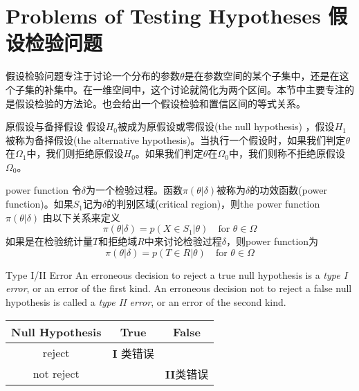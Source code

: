 \documentclass[../main.tex]{subfiles}
\begin{document}
\section{Problems of Testing Hypotheses 假设检验问题}
假设检验问题专注于讨论一个分布的参数$\theta$是在参数空间的某个子集中，还是在这个子集的补集中。在一维空间中，这个讨论就简化为两个区间。本节中主要专注的是假设检验的方法论。也会给出一个假设检验和置信区间的等式关系。

\begin{definition}{原假设与备择假设}{}
假设$H_0$被成为原假设或零假设(the null hypothesis) ，假设$H_1$被称为备择假设(the alternative hypothesis)。当执行一个假设时，如果我们判定$\theta$在$\Omega_1$中，我们则拒绝原假设$H_0$。如果我们判定$\theta$在$\Omega_0$中，我们则称不拒绝原假设$\Omega_0$。
\end{definition}


\begin{definition}{power function}{}
令$\delta$为一个检验过程。函数$\pi(\theta|\delta)$被称为$\delta$的功效函数(power function)。如果$S_1$记为$\delta$的判别区域(critical region)，则the power function $\pi(\theta|\delta)$ 由以下关系来定义
\begin{equation}\label{}
\pi(\theta|\delta)=p(X\in S_1| \theta) \quad\text{for $\theta \in \Omega$}
\end{equation}
如果是在检验统计量$T$和拒绝域$R$中来讨论检验过程$\delta$，则power function为
\begin{equation}\label{}
\pi(\theta|\delta)=p(T\in R|\theta) \quad\text{for $\theta \in \Omega$}
\end{equation}
\end{definition}

\begin{definition}{Type I/II Error}{}
An erroneous decision to reject a true null hypothesis is a \textit{type I error},
or an error of the ﬁrst kind. An erroneous decision not to reject a false null hypothesis is called a \textit{type II error}, or an error of the second kind.
\begin{center}
\begin{tabular}[H]{|c|c|c|}
\hline
Null Hypothesis & True & False \\
\hline
reject & \textbf{I} 类错误 &  \\
\hline
not reject &  &\textbf{II}类错误 \\
\hline
\end{tabular}
\end{center}
\end{definition}
\end{document}
